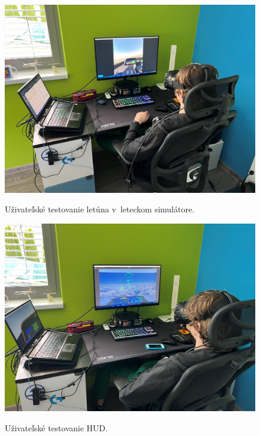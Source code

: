 \begin{figure}[ht]
\centering
\includegraphics[scale=0.27]{obrazky-figures/uzivatel1.png}
\caption{Uživateľské testovanie letúna v~leteckom simulátore.}{\label{uzivatel1}}
\end{figure}

\begin{figure}[ht]
\centering
\includegraphics[scale=0.27]{obrazky-figures/uzivatel2.png}
\caption{Uživateľské testovanie HUD.}{\label{uzivatel2}}
\end{figure}

